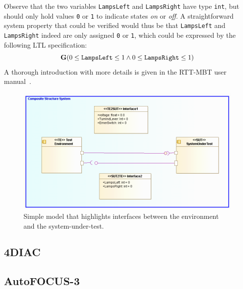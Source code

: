 %
%
%
Observe that the two variables {\tt LampsLeft} and {\tt LampsRight} have type {\tt int}, but should only hold values {\tt 0} or {\tt 1} to indicate states \emph{on} or \emph{off}.
%
A straightforward system property that could be verified would thus be that {\tt LampsLeft} and {\tt LampsRight} indeed are only assigned {\tt 0} or {\tt 1}, which could be expressed by the following LTL specification:
%
%
%
\[
\mathbf{G} (0 \leq {\tt LampsLeft} \leq 1 \wedge 0 \leq {\tt LampsRight} \leq 1)
\]
%
%
%
A thorough introduction with more details is given in the RTT-MBT user manual~\cite{rttmbtmanual}.
%
%
%
\begin{figure}
\centerline{\includegraphics[width=\textwidth]{figures/VSI-modelio_turn_indication_small_toplevel_composite.png}}
\caption{Simple model that highlights interfaces between the environment and
  the system-under-test.}
\label{figure:vsi-simple}
\end{figure}

\subsection{4DIAC}


\subsection{AutoFOCUS-3}

